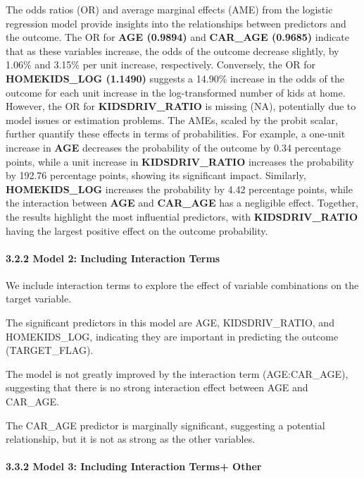 \documentclass[
]{article}
\begin{document}
The odds ratios (OR) and average marginal effects (AME) from the
logistic regression model provide insights into the relationships
between predictors and the outcome. The OR for \textbf{AGE (0.9894)} and
\textbf{CAR\_AGE (0.9685)} indicate that as these variables increase,
the odds of the outcome decrease slightly, by 1.06\% and 3.15\% per unit
increase, respectively. Conversely, the OR for \textbf{HOMEKIDS\_LOG
(1.1490)} suggests a 14.90\% increase in the odds of the outcome for
each unit increase in the log-transformed number of kids at home.
However, the OR for \textbf{KIDSDRIV\_RATIO} is missing (NA),
potentially due to model issues or estimation problems. The AMEs, scaled
by the probit scalar, further quantify these effects in terms of
probabilities. For example, a one-unit increase in \textbf{AGE}
decreases the probability of the outcome by 0.34 percentage points,
while a unit increase in \textbf{KIDSDRIV\_RATIO} increases the
probability by 192.76 percentage points, showing its significant impact.
Similarly, \textbf{HOMEKIDS\_LOG} increases the probability by 4.42
percentage points, while the interaction between \textbf{AGE} and
\textbf{CAR\_AGE} has a negligible effect. Together, the results
highlight the most influential predictors, with \textbf{KIDSDRIV\_RATIO}
having the largest positive effect on the outcome probability.

\paragraph{3.2.2 Model 2: Including Interaction
Terms}\label{model-2-including-interaction-terms-1}

We include interaction terms to explore the effect of variable
combinations on the target variable.

The significant predictors in this model are AGE, KIDSDRIV\_RATIO, and
HOMEKIDS\_LOG, indicating they are important in predicting the outcome
(TARGET\_FLAG).

The model is not greatly improved by the interaction term
(AGE:CAR\_AGE), suggesting that there is no strong interaction effect
between AGE and CAR\_AGE.

The CAR\_AGE predictor is marginally significant, suggesting a potential
relationship, but it is not as strong as the other variables.

\paragraph{3.3.2 Model 3: Including Interaction Terms+
Other}\label{model-3-including-interaction-terms-other}
\end{document}
